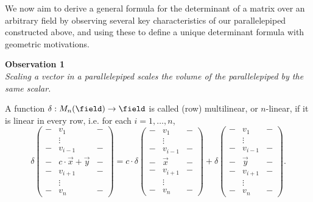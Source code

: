 We now aim to derive a general formula for the determinant of a matrix over an arbitrary field by observing several key characteristics of our parallelepiped constructed above, and using these to define a unique determinant formula with geometric motivations.

\begin{center}
\textbf{Observation 1}\\
\textit{Scaling a vector in a parallelepiped scales the volume of the parallelepiped by the same scalar.}
\end{center}

\begin{definition}
    A function $\delta: M_n(\field) \to \field$ is called (row) multilinear, or $n$-linear, if it is linear in every row, i.e. for each $i = 1, \dots, n$, \[
    \delta \begin{pmatrix}
        - &v_1& -\\
        & \vdots & \\
        - & v_{i-1} & -\\
        - & c \cdot\vec{x} + \vec{y}&-\\
        - & v_{i+1} & -\\
        & \vdots & \\
        - & v_n & -
    \end{pmatrix}  =  c \cdot \delta \begin{pmatrix}
            - &v_1& -\\
            & \vdots & \\
            - & v_{i-1} & -\\
            - & \vec{x} &-\\
            - & v_{i+1} & -\\
            & \vdots & \\
            - & v_n & -
        \end{pmatrix} + \delta \begin{pmatrix}
            - &v_1& -\\
            & \vdots & \\
            - & v_{i-1} & -\\
            - & \vec{y} &-\\
            - & v_{i+1} & -\\
            & \vdots & \\
            - & v_n & -
        \end{pmatrix}.
    \]
\end{definition}

